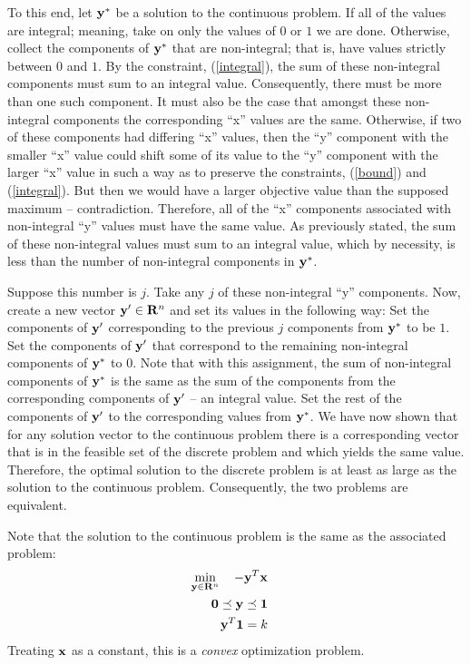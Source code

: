 \documentclass[12pt]{article}
\begin{document}
To this end, let ${\bf y}^*$ be a solution to the continuous problem. If all
of the values are integral; meaning, take on only the values of $0$ or $1$ we 
are done. Otherwise, collect the components of ${\bf y}^*$ that are non-integral;
that is, have values strictly between $0$ and $1$.
By the constraint, (\ref{integral}), the sum of these non-integral components
must sum to an integral value. Consequently, there must be more than one such component. 
It must also be the case that amongst these non-integral components 
the corresponding ``x'' values are the same. Otherwise, if two of these components 
had differing ``x'' values, then the ``y'' component with the 
smaller ``x'' value could shift some of its value to the ``y'' component with 
the larger ``x'' value in such a way as to preserve the constraints, 
(\ref{bound}) and (\ref{integral}). 
But then we would have a larger objective value than the supposed maximum 
-- contradiction. Therefore, all of the 
``x'' components associated with non-integral ``y'' values must have the same 
value. As previously stated, the sum of these non-integral values must sum 
to an integral value, which by necessity, is less than the number of 
non-integral components in ${\bf y}^*$. 

Suppose this number is $j$. Take any $j$ of these non-integral ``y'' components. 
Now, create a new 
vector ${\bf y}^\prime \in {\bf R}^n$ and set its values in the following way: 
Set the components of ${\bf y}^\prime$ corresponding to the previous $j$ components 
from ${\bf y}^*$ to be $1$. Set the components of ${\bf y}^\prime$ that 
correspond to the remaining non-integral components of ${\bf y}^*$ to $0$. Note
that with this assignment, the sum of non-integral components of ${\bf y}^*$
is the same as the sum of the components from the corresponding 
components of ${\bf y}^\prime$ -- an integral value.
Set the rest of the components of ${\bf y}^\prime$ to the 
corresponding values from ${\bf y}^*$. We have now shown that for any 
solution vector to the continuous problem there is a corresponding vector
that is in the feasible set of the discrete problem and which yields the 
same value.
Therefore, the optimal solution to the discrete problem is at least as large as 
the solution to the continuous problem. Consequently, the two problems are 
equivalent.

Note that the solution to the continuous problem is the same as the associated problem:
\begin{eqnarray}
	\mathop{\rm min}_{{\bf y} \in {\bf R}^n}\limits \quad -{\bf y}^T {\bf x} && \label{op1} \\ 
	{\bf 0} \preceq {\bf y} \preceq {\bf 1} &&  \label{op2}\\
	{\bf y}^T {\bf 1} =  k \label{op3} &&
\end{eqnarray}
Treating ${\bf x}$ as a constant, this is a {\it convex\/} optimization problem.
\end{document}
